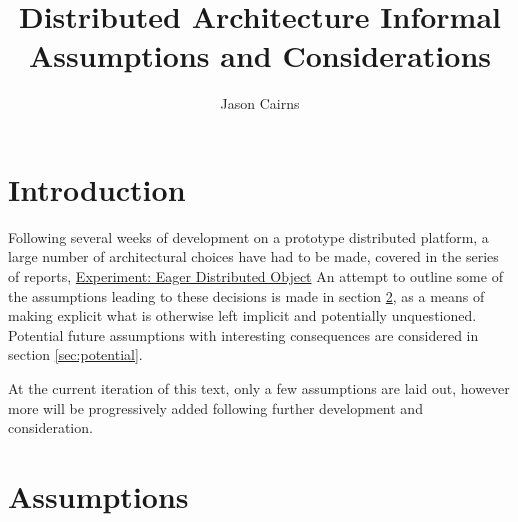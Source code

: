 \documentclass[10pt, a4paper]{article}
\newcounter{assumption}[section]
\begin{document}
\title{Distributed Architecture Informal Assumptions and Considerations}
\author{Jason Cairns}
  
\maketitle

\section{Introduction}
Following several weeks of development on a prototype distributed platform, a
large number of architectural choices have had to be made, covered in the
series of reports, \href{experiment-eager-dist-obj-supp.pdf}{Experiment: Eager
Distributed Object}
An attempt to outline some of the assumptions leading to these decisions is
made in section \ref{sec:assumptions}, as a means of making explicit what is
otherwise left implicit and potentially unquestioned.
Potential future assumptions with interesting consequences are considered in
section \ref{sec:potential}.

At the current iteration of this text, only a few assumptions are laid out,
however more will be progressively added following further development and
consideration.

\section{Assumptions}\label{sec:assumptions}
\end{document}
